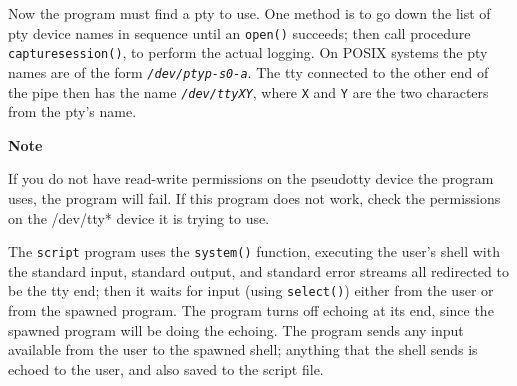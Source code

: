 Now the program must find a pty to use. One method is to go
down the list of pty device names in sequence until an
\texttt{open()} succeeds; then call procedure \texttt{capturesession()},
to perform the actual logging. On POSIX systems the pty
names are of the form \texttt{\textit{/dev/ptyp-s0-a}}. The tty
connected to the other end of the pipe then has the name
\texttt{\textit{/dev/ttyXY}}, where \texttt{X} and \texttt{Y} are the
two characters from the pty's name.



{\sffamily\bfseries
Note}

{\sffamily
If you do not have read-write permissions on the pseudotty device the
program uses, the program will fail. If this program does not work,
check the permissions on the /dev/tty* device it is trying to use. }

The \texttt{script} program uses the \texttt{system()}
function, executing the user's shell with the standard
input, standard output, and standard error streams all redirected to be
the tty end; then it waits for input (using
\texttt{select()}) either from the user or from the
spawned program. The program turns off echoing at its end, since the
spawned program will be doing the echoing. The program sends any input
available from the user to the spawned shell; anything that the shell
sends is echoed to the user, and also saved to the script file. 


